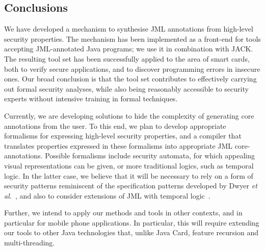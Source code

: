 \subsection{Conclusions}\label{SecConcl} 

We have developed a mechanism to synthesise JML annotations from
high-level security properties. The mechanism has been implemented as
a front-end for tools accepting JML-annotated Java programs; we use
it in combination with JACK. The resulting tool set has been
successfully applied to the area of smart cards, both to verify secure
applications, and to discover programming errors in insecure
ones. Our broad conclusion is that the tool set contributes to
effectively carrying out formal security analyses, while also being
reasonably accessible to security experts without intensive training
in formal techniques.

Currently, we are developing solutions to hide the complexity of
generating core annotations from the user. To this end, we plan to
develop appropriate formalisms for expressing high-level security
properties, and a compiler that translates properties expressed in
these formalisms into appropriate JML core-annotations. Possible
formalisms include security automata, for which appealing visual
representations can be given, or more traditional logics, such as
temporal logic.  In the latter case, we believe that it will be necessary
to rely on a form of security patterns reminiscent of the
specification patterns developed by Dwyer \emph{et
al.}~\cite{DwyerAC98}, and also to consider extensions of JML
with temporal logic~\cite{TrentelmanH02}.


Further, we intend to apply our methods and tools in other contexts,
and in particular for mobile phone applications. In particular, this
will require extending our tools to other Java technologies that,
unlike Java Card, feature recursion and multi-threading.






 
